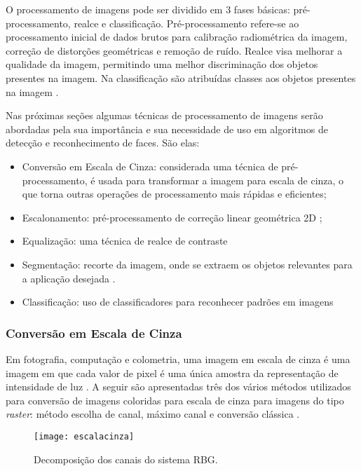 O processamento de imagens pode ser dividido em 3 fases básicas: pré-processamento, realce e classificação.
Pré-processamento refere-se ao processamento inicial de dados brutos para calibração radiométrica da imagem, correção de distorções geométricas e remoção de ruído.
Realce visa melhorar a qualidade da imagem, permitindo uma melhor discriminação dos objetos presentes na imagem.
Na classificação são atribuídas classes aos objetos presentes na imagem \cite{inpe_proc_img}.

Nas próximas seções algumas técnicas de processamento de imagens serão abordadas pela sua importância e sua necessidade de uso em algoritmos de detecção e reconhecimento de faces. São elas:

\begin{itemize}
	\item Conversão em Escala de Cinza: considerada uma técnica de pré-processamento, é usada para transformar a imagem para  escala de cinza, o que torna outras operações de processamento mais rápidas e eficientes;
	\item Escalonamento: pré-processamento de correção linear geométrica 2D \cite{lapix_escala};
	\item Equalização: uma técnica de realce de contraste \cite{gonzalez_woods}
	\item Segmentação: recorte da imagem, onde se extraem os objetos relevantes para a aplicação desejada \cite{inpe_proc_img}.
	\item Classificação: uso de classificadores para reconhecer padrões em imagens \cite{drmathew_java_programming}
\end{itemize}

\subsubsection{Conversão em Escala de Cinza}\label{subsubsec:filtros}

Em fotografia, computação e colometria, uma imagem em escala de cinza é uma imagem em que cada valor de pixel é uma única amostra da representação de intensidade de luz \cite{stephen_greyscale}. A seguir são apresentadas três dos vários métodos utilizados para conversão de imagens coloridas para escala de cinza para imagens do tipo \textit{raster}: método escolha de canal, máximo canal e conversão clássica \cite{ricardo_pdi}.

\begin{figure}[h]
	\centering
	\texttt{[image: escalacinza]}
	\caption{Decomposição dos canais do sistema RBG. }
	\label{escalacinza_img}
\end{figure}


